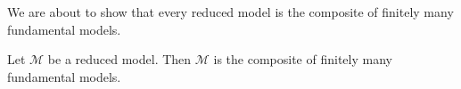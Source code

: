 


We are about to show that every reduced model is the composite of finitely many fundamental models.

\begin{proposition}\label{prop:composition-fundamental}
    Let \( \mathcal{M} \) be a reduced model. Then \( \mathcal{M} \) is the composite of finitely many fundamental models.
\end{proposition}

